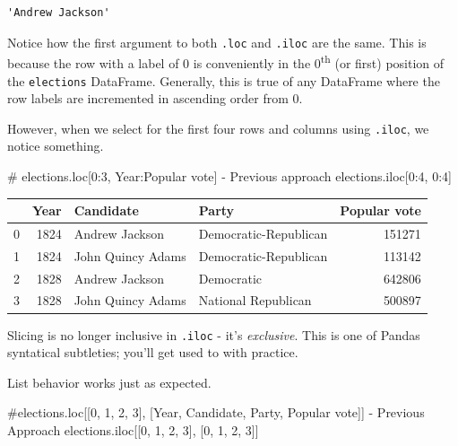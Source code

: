 \documentclass[
  letterpaper,
  DIV=11,
  numbers=noendperiod]{scrreprt}
\newenvironment{Shaded}{\begin{snugshade}}{\end{snugshade}}
\newcommand{\CommentTok}[1]{\textcolor[rgb]{0.37,0.37,0.37}{#1}}
\newcommand{\DecValTok}[1]{\textcolor[rgb]{0.68,0.00,0.00}{#1}}
\newcommand{\NormalTok}[1]{\textcolor[rgb]{0.00,0.23,0.31}{#1}}
\begin{document}
\begin{verbatim}
'Andrew Jackson'
\end{verbatim}

Notice how the first argument to both \texttt{.loc} and \texttt{.iloc}
are the same. This is because the row with a label of 0 is conveniently
in the 0\textsuperscript{th} (or first) position of the
\texttt{elections} DataFrame. Generally, this is true of any DataFrame
where the row labels are incremented in ascending order from 0.

However, when we select for the first four rows and columns using
\texttt{.iloc}, we notice something.

\begin{Shaded}
\begin{Highlighting}[]
\CommentTok{\# elections.loc[0:3, \textquotesingle{}Year\textquotesingle{}:\textquotesingle{}Popular vote\textquotesingle{}] {-} Previous approach}
\NormalTok{elections.iloc[}\DecValTok{0}\NormalTok{:}\DecValTok{4}\NormalTok{, }\DecValTok{0}\NormalTok{:}\DecValTok{4}\NormalTok{]}
\end{Highlighting}
\end{Shaded}

\begin{tabular}{lrllr}
\toprule
{} &  Year &          Candidate &                  Party &  Popular vote \\
\midrule
0 &  1824 &     Andrew Jackson &  Democratic-Republican &        151271 \\
1 &  1824 &  John Quincy Adams &  Democratic-Republican &        113142 \\
2 &  1828 &     Andrew Jackson &             Democratic &        642806 \\
3 &  1828 &  John Quincy Adams &    National Republican &        500897 \\
\bottomrule
\end{tabular}

Slicing is no longer inclusive in \texttt{.iloc} - it's
\emph{exclusive}. This is one of Pandas syntatical subtleties; you'll
get used to with practice.

List behavior works just as expected.

\begin{Shaded}
\begin{Highlighting}[]
\CommentTok{\#elections.loc[[0, 1, 2, 3], [\textquotesingle{}Year\textquotesingle{}, \textquotesingle{}Candidate\textquotesingle{}, \textquotesingle{}Party\textquotesingle{}, \textquotesingle{}Popular vote\textquotesingle{}]] {-} Previous Approach}
\NormalTok{elections.iloc[[}\DecValTok{0}\NormalTok{, }\DecValTok{1}\NormalTok{, }\DecValTok{2}\NormalTok{, }\DecValTok{3}\NormalTok{], [}\DecValTok{0}\NormalTok{, }\DecValTok{1}\NormalTok{, }\DecValTok{2}\NormalTok{, }\DecValTok{3}\NormalTok{]]}
\end{Highlighting}
\end{Shaded}
\end{document}
